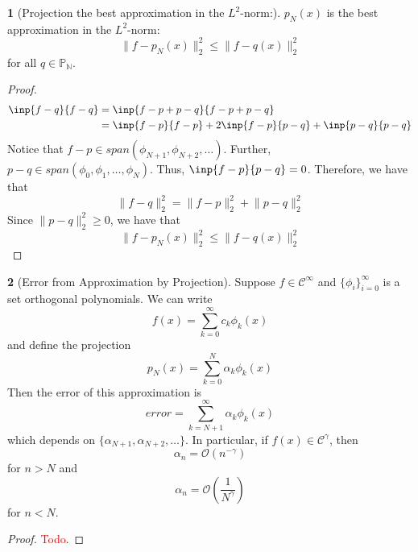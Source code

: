 \documentclass[12pt]{article}
\theoremstyle{definition}
\newtheorem{theorem}{\color{ForestGreen}{\textbf{Theorem}}}
\newcommand{\norm}[1]{\lVert#1\rVert}
\theoremstyle{definition}
\begin{document}
\begin{theorem}[Projection the best approximation in the $L^2$-norm:]
	$p_N(x)$ is the best approximation in the $L^2$-norm:
	\begin{equation}
		\norm{f-p_N(x)}^2_2 \leq \norm{f-q(x)}^2_2
	\end{equation}
	for all $q \in \mathbb{P_N}$.
\end{theorem}
\begin{proof}
\begin{align*}
	\inp{f-q}{f-q} &= \inp{f-p+p-q}{f-p+p-q} \\
	&= \inp{f-p}{f-p} + 2\inp{f-p}{p-q} + \inp{p-q}{p-q} 
\end{align*}
Notice that $f-p \in span(\phi_{N+1}, \phi_{N+2}, \ldots)$. Further, $p-q \in span(\phi_0, \phi_1, \ldots, \phi_N)$. Thus, $\inp{f-p}{p-q} = 0$. Therefore, we have that
\begin{equation}
	\norm{f-q}^2_2 = \norm{f-p}^2_2 + \norm{p-q}^2_2
\end{equation}
Since $\norm{p-q}^2_2 \geq 0$, we have that 
\begin{equation}
	\norm{f-p_N(x)}^2_2 \leq \norm{f-q(x)}^2_2
\end{equation}
\end{proof}

\begin{theorem}[Error from Approximation by Projection]
Suppose $f \in \mathcal{C}^\infty$ and $\{\phi_i\}_{i=0}^{\infty}$ is a set orthogonal polynomials. We can write
\begin{equation}
	f(x) = \sum_{k=0}^\infty c_k \phi_k(x)
\end{equation}
and define the projection
\begin{equation}
	p_N(x) = \sum_{k=0}^N \alpha_k \phi_k(x)
\end{equation}
Then the error of this approximation is
\begin{equation}
	error = \sum_{k=N+1}^\infty \alpha_k \phi_k(x)
\end{equation}
which depends on $\{\alpha_{N+1}, \alpha_{N+2}, \ldots \}$. In particular, if $f(x) \in \mathcal{C}^\gamma$, then 
\begin{equation}
	\alpha_n = \mathcal{O}(n^{-\gamma})
\end{equation}
for $n > N$ and
\begin{equation}
	\alpha_n = \mathcal{O}\left(\frac{1}{N^\gamma}\right) 
\end{equation}
for $n < N$.
\end{theorem}
\begin{proof}
\textcolor{red}{Todo}.
\end{proof}
\end{document}
